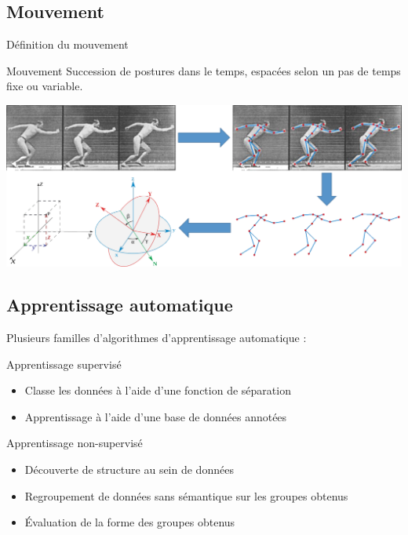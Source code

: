 \documentclass[svgnames]{beamer}
\begin{document}
	\subsection{Mouvement}
	\begin{frame}{Définition du mouvement}
	\begin{block}{Mouvement}
	Succession de postures dans le temps, espacées selon un pas de temps fixe ou variable.
	\end{block}
	\vspace{1cm}
	\centering
		\includegraphics[scale=0.35]{img/mouvement_cadre.png}
	\end{frame}

	\subsection{Apprentissage automatique}
	\begin{frame}{\subsecname}
		Plusieurs familles d'algorithmes d'apprentissage automatique :
		\begin{block}{Apprentissage supervisé}
			\begin{itemize}[label=$-$]
				\item Classe les données à l'aide d'une fonction de séparation
				\item Apprentissage à l'aide d'une base de données annotées
			\end{itemize}
		\end{block}
		
		\begin{block}{Apprentissage non-supervisé}
			\begin{itemize}[label=$-$]
				\item Découverte de structure au sein de données
				\item Regroupement de données sans sémantique sur les groupes obtenus
				\item Évaluation de la forme des groupes obtenus
			\end{itemize}
		\end{block}
	\end{frame}
	
\end{document}
